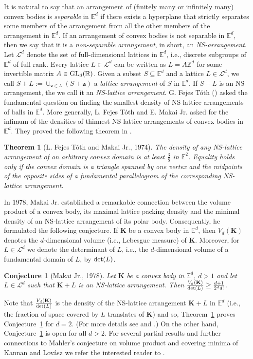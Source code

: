 \documentclass[12pt]{article}
\newtheorem{thm}{Theorem}
\newtheorem{conj}{Conjecture}
\renewcommand{\Re}{\mathbb{R}}
\newcommand{\Z}{\mathbb{Z}}
\newcommand{\Ee}{{\mathbb E}}
\begin{document}
It is natural to say that an arrangement of (finitely many or infinitely many) convex bodies is {\it separable} in $\Ee^d$ if there exists a hyperplane that strictly separates some members of the arrangement from all the other members of the arrangement in $\Ee^d$. If an arrangement of convex bodies is not separable in $\Ee^d$, then we say that it is a {\it non-separable arrangement}, in short, an {\it NS-arrangement}. Let $\mathcal{L}^d$ denote the set of full-dimensional lattices in $\Ee^d$, i.e., discrete subgroups of $\Ee^d$ of full rank. Every lattice $L\in\mathcal{L}^d$ can be written as $L= A\Z^d$ for some invertible matrix $A\in {\rm GL}_d(\Re)$. Given a subset $S\subseteq\Ee^d$ and a lattice $L\in\mathcal{L}^d$, we call $S+L:=\cup_{\mathbf{z}\in L}(S+\mathbf{z})$ a {\it lattice arrangement} of $S$ in $\Ee^d$. If $S+L$ is an NS-arrangement, the we call it an {\it NS-lattice arrangement}. G. Fejes T\'oth (\cite{FeMa74}) asked the fundamental question on finding the smallest density of NS-lattice arrangements of balls in $\Ee^d$. More generally, L. Fejes T\'oth and E. Makai Jr. \cite{FeMa74} asked for the infimum of the densities of thinnest NS-lattice arrangements of convex bodies in $\Ee^d$. They proved the following theorem in \cite{FeMa74}. 
\begin{thm}[L. Fejes T\'oth and Makai Jr., 1974]\label{FTL-Makai}
The density of any NS-lattice arrangement of an arbitrary convex domain is at least $\frac{3}{8}$ in $\Ee^2$. Equality holds only if the convex domain is a triangle spanned by one vertex and the midpoints of the opposite sides of a fundamental parallelogram of the corresponding NS-lattice arrangement.
\end{thm}
In 1978, Makai Jr. \cite{Ma78} established a remarkable connection between the volume product of a convex body, its maximal lattice packing density and the minimal density of an NS-lattice arrangement of its polar body. Consequently, he formulated the following conjecture. If $\mathbf{K}$ be a convex body in $\Ee^d$, then $V_{d}(\mathbf{K})$ denotes the $d$-dimensional volume (i.e., Lebesgue measure) of $\mathbf{K}$. Moreover, for $L\in\mathcal{L}^d$ we denote the determinant of $L$, i.e., the $d$-dimensional volume of a fundamental domain of $L$, by ${\rm det}(L)$.
\begin{conj}[Makai Jr., 1978]\label{Makai}
Let $\mathbf{K}$ be a convex body in $\Ee^d$, $d>1$ and let $L\in\mathcal{L}^d$ such that $\mathbf{K}+L$ is an NS-lattice arrangement. Then $\frac{V_d(\mathbf{K})}{{\rm det}(L)}\geq \frac{d+1}{2^dd!}$.
\end{conj}
Note that $\frac{V_d(\mathbf{K})}{{\rm det}(L)}$ is the density of the NS-lattice arrangement $\mathbf{K}+L$ in $\Ee^d$ (i.e., the fraction of space covered by $L$ translates of $\mathbf{K}$) and so, Theorem~\ref{FTL-Makai} proves Conjecture~\ref{Makai} for $d=2$. (For more details see \cite{FeMa74} and \cite{Ma78}.) On the other hand, Conjecture~\ref{Makai} is open for all $d>2$. For several partial results and further connections to Mahler's conjecture on volume product and covering minima of Kannan and Lov\'asz \cite{KaLo} we refer the interested reader to \cite{GoSc}.
\end{document}

